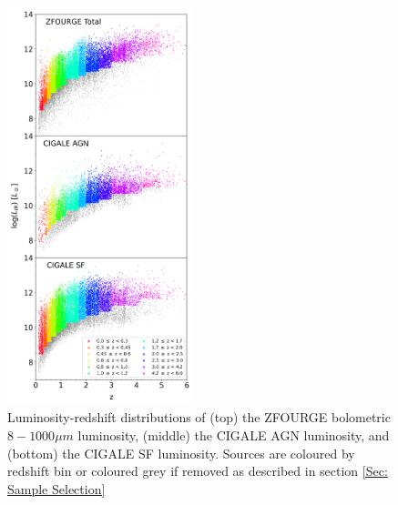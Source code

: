 \begin{figure}
    \centering
    \includegraphics[width=0.48\textwidth]{Figures/LIR vs Z.png}
    \caption{Luminosity-redshift distributions of (top) the ZFOURGE bolometric $8-1000\mu m$ luminosity, (middle) the CIGALE AGN luminosity, and (bottom) the CIGALE SF luminosity. Sources are coloured by redshift bin or coloured grey if removed as described in section \ref{Sec: Sample Selection}}
    \label{Fig: ZF Lum vs z}
\end{figure}


